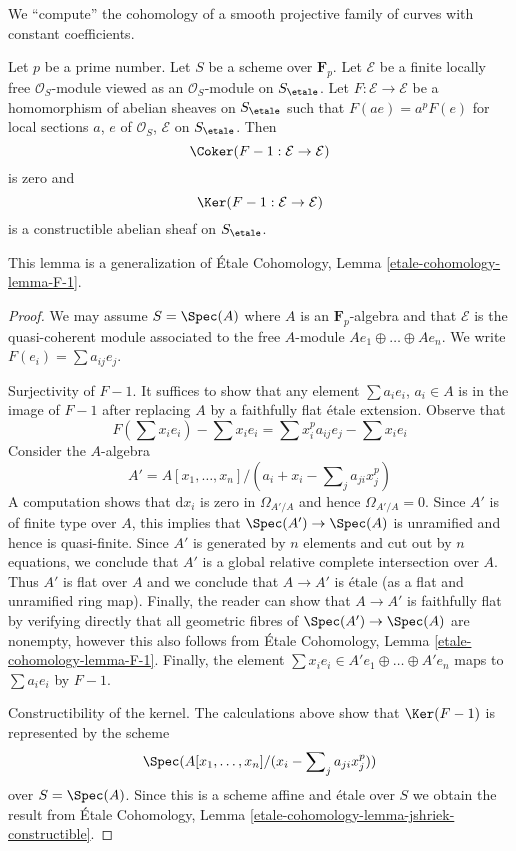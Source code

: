 \noindent
We ``compute'' the cohomology of a smooth projective
family of curves with constant coefficients.

\begin{lemma}
\label{lemma-frobenius-linear-on-vb}
Let $p$ be a prime number. Let $S$ be a scheme over $\mathbf{F}_p$.
Let $\mathcal{E}$ be a finite locally free
$\mathcal{O}_S$-module viewed as an $\mathcal{O}_S$-module on $S_\etale$.
Let $F : \mathcal{E} \to \mathcal{E}$ be a homomorphism of abelian sheaves
on $S_\etale$ such that $F(a e) = a^pF(e)$ for local sections $a$, $e$
of $\mathcal{O}_S$, $\mathcal{E}$ on $S_\etale$. Then
$$
\Coker(F - 1 : \mathcal{E} \to \mathcal{E})
$$
is zero and
$$
\Ker(F - 1 : \mathcal{E} \to \mathcal{E})
$$
is a constructible abelian sheaf on $S_\etale$.
\end{lemma}

\noindent
This lemma is a generalization of \'Etale Cohomology, Lemma
\ref{etale-cohomology-lemma-F-1}.

\begin{proof}
We may assume $S = \Spec(A)$ where $A$ is an $\mathbf{F}_p$-algebra
and that $\mathcal{E}$ is the quasi-coherent module associated
to the free $A$-module $Ae_1 \oplus \ldots \oplus Ae_n$.
We write $F(e_i) = \sum a_{ij} e_j$.

\medskip\noindent
Surjectivity of $F - 1$. It suffices to show that any element
$\sum a_i e_i$, $a_i \in A$ is in the image of $F - 1$
after replacing $A$ by a faithfully flat \'etale extension.
Observe that
$$
F(\sum x_ie_i) - \sum x_i e_i = \sum x_i^p a_{ij} e_j - \sum x_i e_i
$$
Consider the $A$-algebra
$$
A' = A[x_1, \ldots, x_n]/(a_i + x_i - \sum\nolimits_j a_{ji} x_j^p)
$$
A computation shows that $\text{d}x_i$ is zero in $\Omega_{A'/A}$
and hence $\Omega_{A'/A} = 0$. Since $A'$ is of finite type over
$A$, this implies that $\Spec(A') \to \Spec(A)$ is unramified
and hence is quasi-finite. Since $A'$ is generated by $n$ elements
and cut out by $n$ equations, we conclude that $A'$
is a global relative complete intersection over $A$.
Thus $A'$ is flat over $A$ and we conclude that $A \to A'$
is \'etale (as a flat and unramified ring map). Finally,
the reader can show that $A \to A'$ is faithfully flat
by verifying directly that all geometric fibres of
$\Spec(A') \to \Spec(A)$ are nonempty, however this also
follows from \'Etale Cohomology, Lemma
\ref{etale-cohomology-lemma-F-1}.
Finally, the element $\sum x_i e_i \in A'e_1 \oplus \ldots \oplus A'e_n$
maps to $\sum a_i e_i$ by $F - 1$.

\medskip\noindent
Constructibility of the kernel. The calculations above show that
$\Ker(F - 1)$ is represented by the scheme
$$
\Spec(A[x_1, \ldots, x_n]/(x_i - \sum\nolimits_j a_{ji} x_j^p))
$$
over $S = \Spec(A)$. Since this is a scheme affine and \'etale
over $S$ we obtain the result from
\'Etale Cohomology, Lemma \ref{etale-cohomology-lemma-jshriek-constructible}.
\end{proof}

